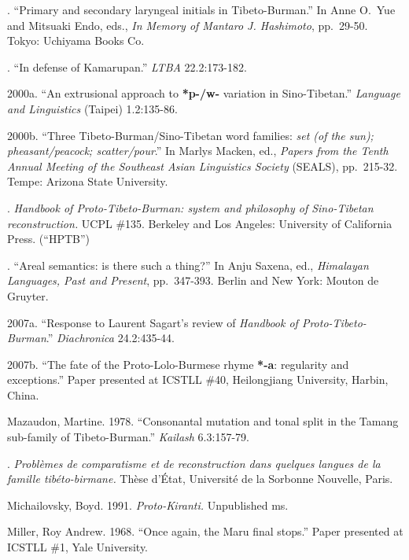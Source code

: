 .
“Primary and secondary laryngeal initials in Tibeto-Burman.”
In Anne O.\ Yue and Mitsuaki Endo, eds., \textit{In Memory of Mantaro J. Hashimoto}, pp.\ 29-50. Tokyo: Uchiyama Books Co.

.
“In defense of Kamarupan.”
\textit{LTBA} 22.2:173-182.

\rrefline %
2000a.
“An extrusional approach to \textbf{*p-/w-} variation in Sino-Tibetan.”
\textit{Language and Linguistics} (Taipei) 1.2:135-86.

\rrefline %
2000b.
“Three Tibeto-Burman/Sino-Tibetan word families: \textit{set (of the sun); pheasant/peacock; scatter/pour}.”
In Marlys Macken, ed., \textit{Papers from the Tenth Annual Meeting of the Southeast Asian Linguistics Society} (SEALS), pp.\ 215-32. Tempe: Arizona State University.

.
\textit{Handbook of Proto-Tibeto-Burman: system and philosophy of Sino-Tibetan reconstruction.}
UCPL \#135.  Berkeley and Los Angeles: University of California Press. (“HPTB”)

.
“Areal semantics: is there such a thing?”
In Anju Saxena, ed., \textit{Himalayan Languages, Past and Present}, pp.\ 347-393.  Berlin and New York: Mouton de Gruyter.


\rrefline %
2007a.
“Response to Laurent Sagart’s review of \textit{Handbook of Proto-Tibeto-Burman}.”
\textit{Diachronica} 24.2:435-44.

\rrefline %
2007b.
“The fate of the Proto-Lolo-Burmese rhyme \textbf{*-a}: regularity and exceptions.”
Paper presented at ICSTLL \#40, Heilongjiang University, Harbin, China.

Mazaudon, Martine.
1978.
“Consonantal mutation and tonal split in the Tamang sub-family of Tibeto-Burman.”
\textit{Kailash} 6.3:157-79.

.
\textit{Problèmes de comparatisme et de reconstruction dans quelques langues de la famille tibéto-birmane.}
Thèse d’État, Université de la Sorbonne Nouvelle, Paris.

Michailovsky, Boyd.
1991.
\textit{Proto-Kiranti.}
Unpublished ms.

Miller, Roy Andrew.
1968.
“Once again, the Maru ﬁnal stops.”
Paper presented at ICSTLL \#1, Yale University.

